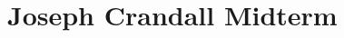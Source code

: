 \documentclass[main.tex]{subfiles}
\begin{document}

\section{Joseph Crandall Midterm}
\end{document}
